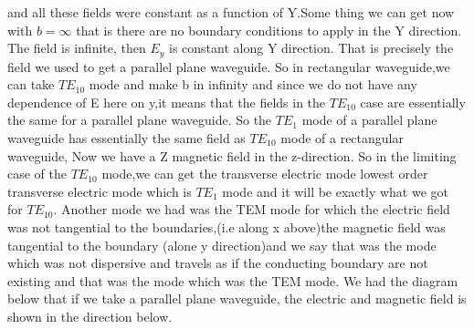 and all these fields were constant as a function of Y.Some thing we can get now with ${b=\infty}$ that is there are no boundary conditions to apply in the Y direction. The field is infinite, then ${E_y}$ is constant along Y direction. That is precisely the field we used to get a parallel plane waveguide. So in rectangular waveguide,we can take ${TE_{10}}$ mode and make b in infinity and since we do not have any dependence of E here on y,it means that the fields in the ${TE_{10}}$ case are essentially the same for a parallel plane waveguide. So the ${TE_1}$ mode of a parallel plane waveguide has essentially the same field as ${TE_{10}}$ mode of a rectangular waveguide, Now we have a Z magnetic field in the z-direction. So in the limiting case of the ${TE_{10}}$ mode,we can get the transverse electric mode lowest order transverse electric mode which is $TE_1$ mode and it will be exactly what we got for ${TE_{10}}$. Another mode we had was the TEM mode for which the electric field was not tangential to the boundaries,(i.e along x above)the magnetic field was tangential to the boundary (alone y direction)and we say that was the mode which was not dispersive and travels as if the conducting boundary are not existing and that was the mode which was the TEM mode. We had the diagram below that if we take a parallel plane waveguide, the electric and magnetic field is shown in the direction below. 

